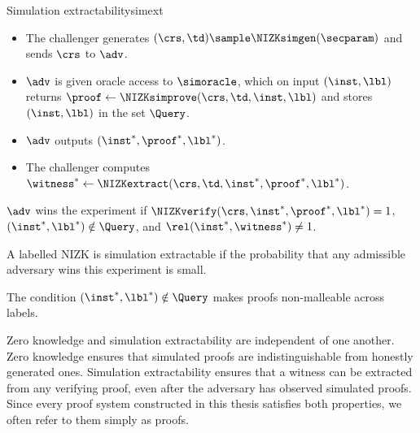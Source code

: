 \begin{experimentbox}{Simulation extractability}{simext}

  \begin{itemize}

    \item The challenger generates $(\crs, \td) \sample \NIZKsimgen(\secparam)$
      and sends $\crs$ to $\adv$.

    \item $\adv$ is given oracle access to $\simoracle$, which on input
      $(\inst, \lbl)$ returns $\proof \leftarrow \NIZKsimprove(\crs, \td,
      \inst, \lbl)$ and stores $(\inst, \lbl)$ in the set $\Query$.

    \item $\adv$ outputs $(\inst^*, \proof^*, \lbl^*)$.

    \item The challenger computes $\witness^* \leftarrow \NIZKextract(\crs,
      \td, \inst^*, \proof^*, \lbl^*)$.

  \end{itemize}

  $\adv$ wins the experiment if $\NIZKverify(\crs, \inst^*, \proof^*, \lbl^*) =
  1$, $(\inst^*, \lbl^*) \notin \Query$, and $\rel(\inst^*, \witness^*) \neq
  1$.

\end{experimentbox}

A labelled NIZK is simulation extractable if the probability that any
admissible adversary wins this experiment is small.

The condition $(\inst^*, \lbl^*) \notin \Query$ makes proofs non-malleable
across labels.

Zero knowledge and simulation extractability are independent of one another.
Zero knowledge ensures that simulated proofs are indistinguishable from
honestly generated ones. Simulation extractability ensures that a witness can
be extracted from any verifying proof, even after the adversary has observed
simulated proofs. Since every proof system constructed in this thesis satisfies
both properties, we often refer to them simply as proofs.
